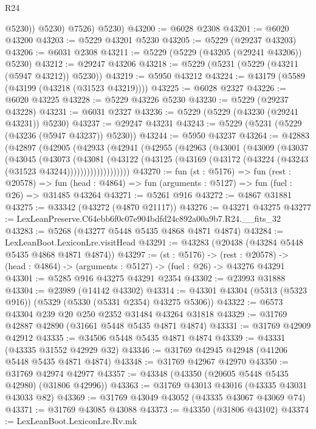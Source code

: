\begin{lexlean}{R24}
\begin{coremodule}
              @5230))
          @5230)
        @7526)
      @5230)
@43200 := @6028 @2308
@43201 := @6020 @43200
@43203 := @5229 @43201 @5230
@43205 := @5229 (@29237 @43203)
@43206 := @6031 @2308
@43211 := @5229 (@5229 (@43205 (@29241 @43206)) @5230)
@43212 := @29247 @43206
@43218 := @5229 (@5231 (@5229 (@43211 (@5947 @43212)) @5230))
@43219 := @5950 @43212
@43224 := @43179 (@5589 (@43199 (@43218 (@31523 @43219))))
@43225 := @6028 @2327
@43226 := @6020 @43225
@43228 := @5229 @43226 @5230
@43230 := @5229 (@29237 @43228)
@43231 := @6031 @2327
@43236 := @5229 (@5229 (@43230 (@29241 @43231)) @5230)
@43237 := @29247 @43231
@43243 := @5229 (@5231 (@5229 (@43236 (@5947 @43237)) @5230))
@43244 := @5950 @43237
@43264 := @42883
    (@42897
      (@42905
        (@42933
          (@42941
            (@42955
              (@42963
                (@43001
                  (@43009
                    (@43037
                      (@43045
                        (@43073
                          (@43081
                            (@43122
                              (@43125
                                (@43169 (@43172 (@43224 (@43243 (@31523 @43244)))))))))))))))))))
@43270 := fun (st : @5176) =>
  fun (rest : @20578) =>
  fun (head : @4864) => fun (arguments : @5127) => fun (fuel : @26) => @31485 @43264
@43271 := @5261 @916
@43272 := @4867 @31881
@43275 := @33342 (@43272 (@4870 @21117))
@43276 := @43271 @43275
@43277 := LexLeanPreserve.C64ebb6f0c07e904bdfd24c892a00a9b7.R24.__fits_32
@43283 := @5268 (@43277 @5448 @5435 @4868 @4871 @4874)
@43284 := LexLeanBoot.LexiconLre.visitHead
@43291 := @43283 (@20438 (@43284 @5448 @5435 @4868 @4871 @4874))
@43297 := (st : @5176) ->
  (rest : @20578) -> (head : @4864) -> (arguments : @5127) -> (fuel : @26) -> @43276 @43291
@43301 := @5285 @916 @43275 @43291 @2354
@43302 := @23993 @31888
@43304 := @23989 (@14142 @43302)
@43314 := @43301 @43304 (@5313 (@5323 @916)) (@5329 (@5330 (@5331 @2354) @43275 @5306))
@43322 := @6573 @43304 @239 @20 @250 @2352 @31484 @43264 @31818
@43329 := @31769 @42887 @42890 (@31661 @5448 @5435 @4871 @4874)
@43331 := @31769 @42909 @42912
@43335 := @34506 @5448 @5435 @4871 @4874
@43339 := @43331 (@43335 @31552 @42929 @32)
@43346 := @31769 @42945 @42948 (@41206 @5448 @5435 @4871 @4874)
@43348 := @31769 @42967 @42970
@43350 := @31769 @42974 @42977
@43357 := @43348 (@43350 (@20605 @5448 @5435 @42980) (@31806 @42996))
@43363 := @31769 @43013 @43016 (@43335 @43031 @43033 @82)
@43369 := @31769 @43049 @43052 (@43335 @43067 @43069 @74)
@43371 := @31769 @43085 @43088
@43373 := @43350 (@31806 @43102)
@43374 := LexLeanBoot.LexiconLre.Rv.mk

\end{coremodule}
\end{lexlean}

